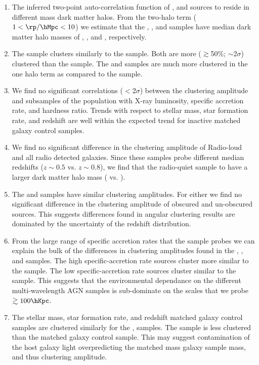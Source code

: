 \begin{enumerate}

\item The inferred two-point auto-correlation function of \Xray, \Radio and \Donley sources to reside in different mass dark matter halos. 
From the two-halo term ($1<\rp/\hMpc<10$) we estimate that the \Xray, \Radio, and \Donley samples have median dark matter halo masses of 
, , and , respectively.

\item The \Xray sample clusters similarly to the \Radio sample.  Both are more ($\gtrsim$50\%; $\sim$2$\sigma$) clustered than the \Donley sample. The \Xray and \Radio samples are much more clustered in the one halo term as compared to the \Donley sample.

\item We find no significant correlations ($<$2$\sigma$) between the clustering amplitude and subsamples of the \Xray population with X-ray luminosity, specific accretion rate, and hardness ratio.
Trends with respect to stellar mass, star formation rate, and redshift are well within the expected trend for inactive matched galaxy control samples.

\item We find no significant difference in the clustering amplitude of  Radio-loud and all radio detected galaxies.
Since these samples probe different median redshifts ($z\sim0.5$ vs. $z\sim0.8$), we find that the radio-quiet sample to have a larger dark matter halo mass ( vs. ).

\item The \Donley and \Assef samples have similar clustering amplitudes.  For either we find no significant difference in the clustering amplitude of obscured and un-obscured \Assef sources.
This suggests differences found in angular clustering results are dominated by the uncertainty of the redshift distribution.

\item From the large range of specific accretion rates that the \Xray sample probes we can explain the bulk of the differences in clustering amplitudes found in the \Xray, \Radio, and \IR samples.
The high specific-accretion rate \Xray sources cluster more similar to the \Donley sample.
The low specific-accretion rate \Xray sources cluster similar to the \Radio sample.
This suggests that the environmental dependance on the different multi-wavelength AGN samples is sub-dominate on the scales that we probe $\gtrsim100\hKpc$.

\item The stellar mass, star formation rate, and redshift matched galaxy control samples are clustered similarly for the \Xray, \Radio samples.
The \Donley sample is less clustered than the matched galaxy control sample.
This may suggest contamination of the host galaxy light overpredicting the matched mass galaxy sample mass, and thus clustering amplitude.

\end{enumerate}


